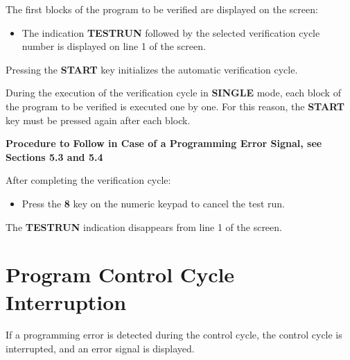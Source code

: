 The first blocks of the program to be verified are displayed on the screen:

\begin{itemize}
    \item The indication \textbf{TESTRUN} followed by the selected verification cycle number is displayed on line 1 of the screen.
\end{itemize}

\begin{itemize}
\end{itemize}
\vspace{.5cm}

Pressing the \textbf{START} key initializes the automatic verification cycle.

During the execution of the verification cycle in \textbf{SINGLE} mode, each block of the program to be verified is executed one by one. For this reason, the \textbf{START} key must be pressed again after each block.

\vspace{.5cm}
\textbf{Procedure to Follow in Case of a Programming Error Signal, see Sections 5.3 and 5.4}

After completing the verification cycle:

\begin{itemize}
\end{itemize}
\vspace{.5cm}

\begin{itemize}
\end{itemize}
\vspace{.5cm}
\begin{itemize}
    \item Press the \textbf{8} key on the numeric keypad to cancel the test run.
\end{itemize}

The \textbf{TESTRUN} indication disappears from line 1 of the screen.

\newpage

\section{Program Control Cycle Interruption}

If a programming error is detected during the control cycle, the control cycle is interrupted, and an error signal is displayed.

